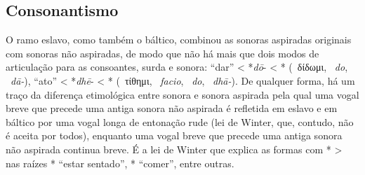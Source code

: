 \subsection{Consonantismo}\label{sec:consoantes}
O ramo eslavo, como também o báltico, combinou as sonoras aspiradas originais
com sonoras não aspiradas, de modo que não há mais que dois modos de articulação
para as consoantes, surda e sonora:  ``dar'' < *\emph{dō}- <
* (~δίδωμι, ~\emph{do},
~\emph{dā-}),   ``ato'' < *\emph{dhē}- <
* (~τίθημι,
~\emph{facio}, ~\emph{do},
~\emph{dhā-}).
De qualquer forma, há um traço da diferença etimológica entre sonora e sonora
aspirada pela qual uma vogal breve que precede uma antiga sonora não aspirada é
refletida em eslavo e em báltico por uma vogal longa de entonação rude (lei de
Winter, que, contudo, não é aceita por todos), enquanto uma vogal breve que
precede uma antiga sonora não aspirada continua breve.
É a lei de Winter que explica as formas com * >  nas raízes
* ``estar sentado'', * ``comer'', entre outras.



